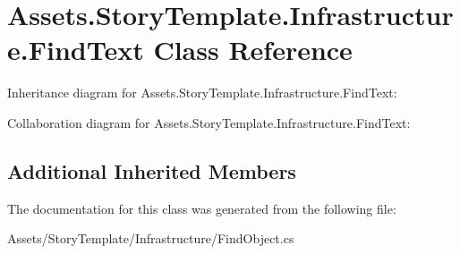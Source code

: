 \hypertarget{classAssets_1_1StoryTemplate_1_1Infrastructure_1_1FindText}{}\section{Assets.\+Story\+Template.\+Infrastructure.\+Find\+Text Class Reference}
\label{classAssets_1_1StoryTemplate_1_1Infrastructure_1_1FindText}


Inheritance diagram for Assets.\+Story\+Template.\+Infrastructure.\+Find\+Text\+:


Collaboration diagram for Assets.\+Story\+Template.\+Infrastructure.\+Find\+Text\+:
\subsection*{Additional Inherited Members}


The documentation for this class was generated from the following file\+:\begin{DoxyCompactItemize}
\item 
Assets/\+Story\+Template/\+Infrastructure/Find\+Object.\+cs\end{DoxyCompactItemize}
